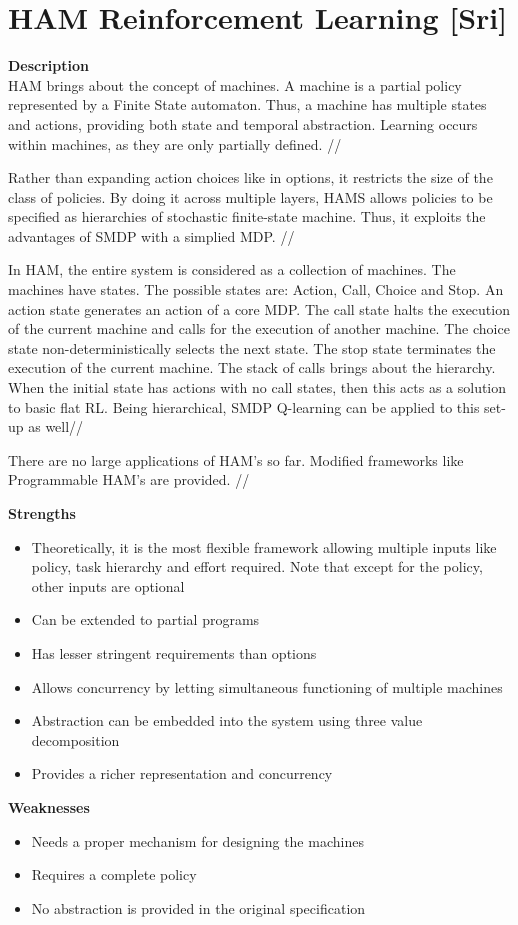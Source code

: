 \section{HAM Reinforcement Learning [Sri]}
\textbf{Description} \\

HAM brings about the concept of machines. A machine is a partial policy represented by a Finite State automaton. Thus, a machine has multiple states and actions, providing both state and temporal abstraction. Learning occurs within machines, as they are only partially defined. //

Rather than expanding action choices like in options, it restricts the size of the class of policies. By doing it across multiple layers, HAMS allows policies to be specified as  hierarchies of stochastic finite-state machine. Thus, it exploits the advantages of SMDP with a simplied MDP. //

In HAM, the entire system is considered as a collection of machines. The machines have states. The possible states are: Action, Call, Choice and Stop. An action state generates an action of a core MDP. The call state halts the execution of the current machine and calls for the execution of another machine. The choice state non-deterministically selects the next state. The stop state terminates the execution of the current machine. The stack of calls brings about the hierarchy. When the initial state has actions with no call states, then this acts as a solution to basic flat RL. Being hierarchical, SMDP Q-learning can be applied to this set-up as well//

There are no large applications of HAM's so far. Modified frameworks like Programmable HAM's are provided. //


\textbf{Strengths}
\begin{itemize}
    \item Theoretically, it is the most flexible framework allowing multiple inputs like policy, task hierarchy and effort required. Note that except for the policy, other inputs are optional
    \item Can be extended to partial programs 
    \item Has lesser stringent requirements than options
    \item Allows concurrency by letting simultaneous functioning of multiple machines
    \item Abstraction can be embedded into the system using three value decomposition
    \item Provides a richer representation and concurrency
\end{itemize}

\textbf{Weaknesses}
\begin{itemize}
    \item Needs a proper mechanism for designing the machines 
    \item Requires a complete policy
    \item No abstraction is provided in the original specification 
\end{itemize}

